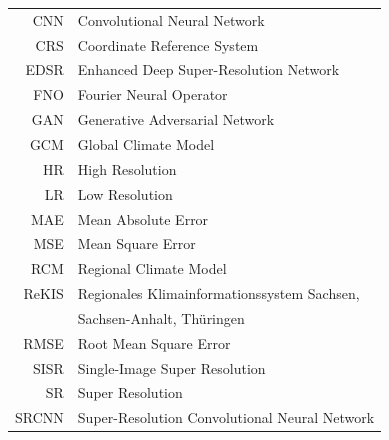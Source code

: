 \documentclass[english,bachelor,oneside]{ctufit-thesis}
\begin{document}
\begin{tabular}{rl}
    CNN & Convolutional Neural Network \\
    CRS & Coordinate Reference System \\
    EDSR & Enhanced Deep Super-Resolution Network \\
    FNO & Fourier Neural Operator \\
    GAN & Generative Adversarial Network \\
    GCM & Global Climate Model \\
    HR & High Resolution \\
    LR & Low Resolution \\
    MAE & Mean Absolute Error \\
    MSE & Mean Square Error \\
    RCM & Regional Climate Model \\
    ReKIS & Regionales Klimainformationssystem Sachsen, \\ & Sachsen-Anhalt, Thüringen \\
    RMSE & Root Mean Square Error \\
	SISR & Single-Image Super Resolution \\
	SR & Super Resolution \\
    SRCNN & Super-Resolution Convolutional Neural Network \\
\end{tabular}
\resumeTOCentries
\mainmatter\mainmatterinit %












\appendix\appendixinit %


\backmatter %

\printbibliography %

\end{document}
